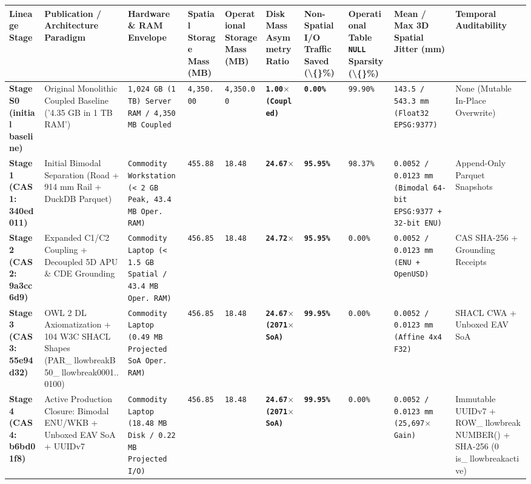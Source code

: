 \documentclass[10pt,a4paper]{article}
\begin{document}
{\scriptsize
\begin{longtable}{p{}p{}p{}p{}p{}p{}p{}p{}p{}p{}}
\toprule
\textbf{Lineage Stage} & \textbf{Publication / Architecture Paradigm} & \textbf{Hardware \& RAM Envelope} & \textbf{Spatial Storage Mass (MB)} & \textbf{Operational Storage Mass (MB)} & \textbf{Disk Mass Asymmetry Ratio} & \textbf{Non-Spatial I/O Traffic Saved (\textbackslash\{\}\%)} & \textbf{Operational Table \texttt{NULL} Sparsity (\textbackslash\{\}\%)} & \textbf{Mean / Max 3D Spatial Jitter (mm)} & \textbf{Temporal Auditability} \\
\midrule
\endhead
\textbf{Stage S0 (initial baseline)} & Original Monolithic Coupled Baseline ('4.35 GB in 1 TB RAM') & \texttt{1,024 GB (1 TB) Server RAM / 4,350 MB Coupled} & \texttt{4,350.00} & \texttt{4,350.00} & \textbf{\texttt{1.00$\times$ (Coupled)}} & \textbf{\texttt{0.00\%}} & \texttt{99.90\%} & \texttt{143.5 / 543.3 mm (Float32 EPSG:9377)} & None (Mutable In-Place Overwrite) \\
\textbf{Stage 1 (CAS 1: 340ed011)} & Initial Bimodal Separation (Road + 914 mm Rail + DuckDB Parquet) & \texttt{Commodity Workstation (< 2 GB Peak, 43.4 MB Oper. RAM)} & \texttt{455.88} & \texttt{18.48} & \textbf{\texttt{24.67$\times$}} & \textbf{\texttt{95.95\%}} & \texttt{98.37\%} & \texttt{0.0052 / 0.0123 mm (Bimodal 64-bit EPSG:9377 + 32-bit ENU)} & Append-Only Parquet Snapshots \\
\textbf{Stage 2 (CAS 2: 9a3cc6d9)} & Expanded C1/C2 Coupling + Decoupled 5D APU \& CDE Grounding & \texttt{Commodity Laptop (< 1.5 GB Spatial / 43.4 MB Oper. RAM)} & \texttt{456.85} & \texttt{18.48} & \textbf{\texttt{24.72$\times$}} & \textbf{\texttt{95.95\%}} & \texttt{0.00\%} & \texttt{0.0052 / 0.0123 mm (ENU + OpenUSD)} & CAS SHA-256 + Grounding Receipts \\
\textbf{Stage 3 (CAS 3: 55e94d32)} & OWL 2 DL Axiomatization + 104 W3C SHACL Shapes (PAR\_llowbreak{}B50\_llowbreak{}0001..0100) & \texttt{Commodity Laptop (0.49 MB Projected SoA Oper. RAM)} & \texttt{456.85} & \texttt{18.48} & \textbf{\texttt{24.67$\times$ (2071$\times$ SoA)}} & \textbf{\texttt{99.95\%}} & \texttt{0.00\%} & \texttt{0.0052 / 0.0123 mm (Affine 4x4 F32)} & SHACL CWA + Unboxed EAV SoA \\
\textbf{Stage 4 (CAS 4: b6bd01f8)} & Active Production Closure: Bimodal ENU/WKB + Unboxed EAV SoA + UUIDv7 & \texttt{Commodity Laptop (18.48 MB Disk / 0.22 MB Projected I/O)} & \texttt{456.85} & \texttt{18.48} & \textbf{\texttt{24.67$\times$ (2071$\times$ SoA)}} & \textbf{\texttt{99.95\%}} & \texttt{0.00\%} & \texttt{0.0052 / 0.0123 mm (25,697$\times$ Gain)} & Immutable UUIDv7 + ROW\_llowbreak{}NUMBER() + SHA-256 (0 is\_llowbreak{}active) \\
\bottomrule
\end{longtable}
}
\end{document}
